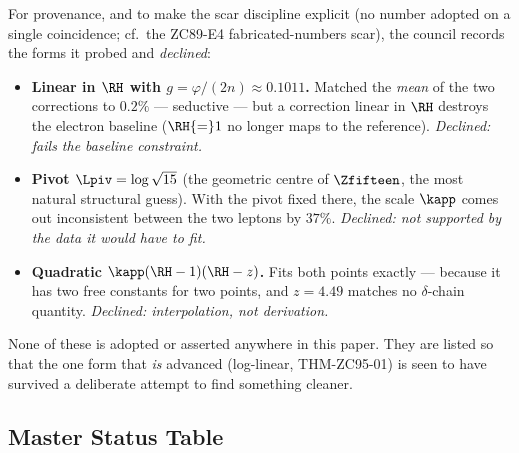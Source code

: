 \documentclass[12pt, a4paper]{article}
\begin{document}
\begin{openqbox}[title={OBS-ZC95-01: Candidate Constants Considered and Declined}]
For provenance, and to make the scar discipline explicit (no number adopted on
a single coincidence; cf.\ the ZC89-E4 fabricated-numbers scar), the council
records the forms it probed and \emph{declined}:
\begin{itemize}[leftmargin=1.8em, noitemsep]
  \item \textbf{Linear in $\RH$ with $g=\varphi/(2n)\approx0.1011$.} Matched the
    \emph{mean} of the two corrections to $0.2\%$ --- seductive --- but a
    correction linear in $\RH$ destroys the electron baseline ($\RH{=}1$ no
    longer maps to the reference). \emph{Declined: fails the baseline
    constraint.}
  \item \textbf{Pivot $\Lpiv=\log\sqrt{15}$} (the geometric centre of
    $\Zfifteen$, the most natural structural guess). With the pivot fixed there,
    the scale $\kapp$ comes out inconsistent between the two leptons by $37\%$.
    \emph{Declined: not supported by the data it would have to fit.}
  \item \textbf{Quadratic $\kapp(\RH-1)(\RH-z)$.} Fits both points exactly --- 
    because it has two free constants for two points, and $z=4.49$ matches no
    $\delta$-chain quantity. \emph{Declined: interpolation, not derivation.}
\end{itemize}
None of these is adopted or asserted anywhere in this paper. They are listed so
that the one form that \emph{is} advanced (log-linear, THM-ZC95-01) is seen to
have survived a deliberate attempt to find something cleaner.
\end{openqbox}

\subsection{Master Status Table}
\end{document}
